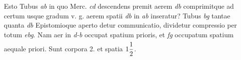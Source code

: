             Esto Tubus \textit{ab} %
            in quo Merc.\protect{} \textit{cd} descendens premit aerem \textit{db} comprimitque ad certum usque gradum v. g. aerem spatii \textit{db} in  \textit{ab} inseratur?  Tubus \textit{bg} tantae  quanta \textit{db} Epistomioque\protect{} aperto detur communicatio, dividetur compressio\protect{} per totum \textit{ebg}. Nam aer in \textit{d-b} occupat spatium  prioris, et \textit{fg} occupatum spatium aequale priori. Sunt corpora 2. et spatia $\rule[-4mm]{0mm}{10mm}1\displaystyle\frac{1}{2}$.
